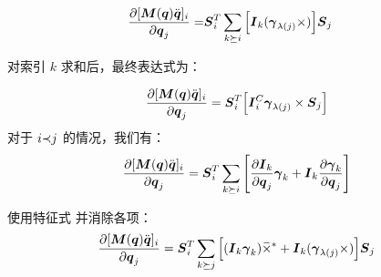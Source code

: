 \documentclass[letterpaper, 10 pt, conference]{ieeetran}  %
\begin{document}

  \begin{equation}
      \begin{aligned}
         \frac{\partial [ \boldsymbol{M}(\boldsymbol{q}) \ddot{\boldsymbol{q}}]_{i}}{\partial \boldsymbol{q}_{j}} =  &  \boldsymbol{S}_{i}^{T}  \sum_{k \succeq i} \Big[
         \boldsymbol{I}{}_{k}  ( \boldsymbol{\gamma}_{\lambda(j)} \times ) \Big]   \boldsymbol{S}_{j}
      \end{aligned}
\end{equation} 

\noindent 对索引 $k$ 求和后，最终表达式为：


\begin{equation}
      \frac{\partial [ \M(\q) \qdd]_{i}}{\partial \red{\q_{j}}} =  \red{\Phibar_{i}^{T} \Big[  \I_{i}^{C}  \gammabar_{\lambda(j)}   \times \Phibar_{j} \Big]} 
    \label{partial_Mqddot_1}
\end{equation}
对于 $i {\color{black}\prec} j$ 的情况，我们有：
 \begin{equation}
         \frac{\partial [ \M(\q) \qdd]_{i}}{\partial \q_{j}} =   \Phibar_{i}^{T}  \sum_{k \succeq i} \Bigg[\frac{\partial \I_{k}}{\partial \q_{j}} \gammabar_{k} + \I_{k} \frac{\partial \gammabar_{k}}{\partial \q_{j}} \Bigg]
        \label{partial_Mqddot_4}
\end{equation}
 
\noindent 使用特征式  并消除各项：
   \begin{equation}
      \begin{aligned}
       \frac{\partial [ \M(\q) \qdd]_{i}}{\partial \q_{j}} = 
     \Phibar_{i}^{T}  \sum_{ k \succeq j} \Big[(\I_{k} \gammabar_{k}) \crff + \I_{k}  (\gammabar_{\lambda(j)}  \times)  \Big]\Phibar_{j}  
        \label{partial_Mqddot_5}
      \end{aligned}
\end{equation} 
\end{document}
